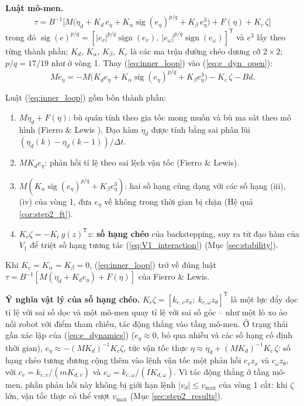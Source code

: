 \documentclass[12pt,a4paper]{article}
\newcommand{\T}{\mathsf{T}}
\DeclareMathOperator{\sign}{sign}
\begin{document}
\textbf{Luật mô-men.}
\begin{equation}\label{eq:inner_loop}
    \boxed{\tau = B^{-1}\Big[ M\big(\dot\eta_d + K_d\, e_\eta + K_\alpha \operatorname{sig}(e_\eta)^{p/q} + K_\beta\, e_\eta^{3}\big) + F(\eta) + K_c\,\zeta \Big]}
\end{equation}
trong đó $\operatorname{sig}(e)^{p/q} = [|e_v|^{p/q}\sign(e_v),\ |e_\omega|^{p/q}\sign(e_\omega)]^\T$ và $e^3$ lấy theo từng thành phần; $K_d$, $K_\alpha$, $K_\beta$, $K_c$ là các ma trận đường chéo dương cỡ $2\times 2$; $p/q = 17/19$ như ở vòng 1. Thay (\ref{eq:inner_loop}) vào (\ref{eq:e_dyn_open}):
\begin{equation}\label{eq:e_dynamics}
    M\dot e_\eta = -M\big(K_d e_\eta + K_\alpha \operatorname{sig}(e_\eta)^{p/q} + K_\beta e_\eta^3\big) - K_c\,\zeta - B d .
\end{equation}

Luật (\ref{eq:inner_loop}) gồm bốn thành phần:
\begin{enumerate}
    \item $M\dot\eta_d + F(\eta)$: bù quán tính theo gia tốc mong muốn và bù ma sát theo mô hình (Fierro \& Lewis \cite{Fierro1997}). Đạo hàm $\dot\eta_d$ được tính bằng sai phân lùi $(\eta_d(k) - \eta_d(k-1))/\Delta t$.
    \item $MK_d e_\eta$: phản hồi tỉ lệ theo sai lệch vận tốc (Fierro \& Lewis).
    \item $M(K_\alpha \operatorname{sig}(e_\eta)^{p/q} + K_\beta e_\eta^3)$: hai số hạng cùng dạng với các số hạng (iii), (iv) của vòng 1, đưa $e_\eta$ về không trong thời gian bị chặn (Hệ quả \ref{cor:step2_ft}).
    \item $K_c\zeta = -K_c\, g(z)^\T z$: \textbf{số hạng chéo} của backstepping, suy ra từ đạo hàm của $V_1$ để triệt số hạng tương tác (\ref{eq:V1_interaction}) (Mục \ref{sec:stability}).
\end{enumerate}
Khi $K_c = K_\alpha = K_\beta = 0$, (\ref{eq:inner_loop}) trở về đúng luật $\tau = B^{-1}[M(\dot\eta_d + K_d e_\eta) + F(\eta)]$ của Fierro \& Lewis.

\textbf{Ý nghĩa vật lý của số hạng chéo.} $K_c\zeta = [k_{c,v}z_x;\ k_{c,\omega}z_\theta]^\T$ là một lực đẩy dọc tỉ lệ với sai số dọc và một mô-men quay tỉ lệ với sai số góc -- như một lò xo ảo nối robot với điểm tham chiếu, tác động thẳng vào tầng mô-men. Ở trạng thái gần xác lập của (\ref{eq:e_dynamics}) ($\dot e_\eta \approx 0$, bỏ qua nhiễu và các số hạng cố định thời gian), $e_\eta \approx -(MK_d)^{-1}K_c\zeta$, tức vận tốc thực $\eta \approx \eta_d + (MK_d)^{-1}K_c\,\zeta$: số hạng chéo tương đương cộng thêm vào lệnh vận tốc một phản hồi $c_v z_x$ và $c_\omega z_\theta$, với $c_v = k_{c,v}/(mK_{d,v})$ và $c_\omega = k_{c,\omega}/(IK_{d,\omega})$. Vì tác động thẳng ở tầng mô-men, phần phản hồi này không bị giới hạn lệnh $|v_d| \leq v_{\max}$ của vòng 1 cắt: khi $\zeta$ lớn, vận tốc thực có thể vượt $v_{\max}$ (Mục \ref{sec:step2_results}).
\end{document}

